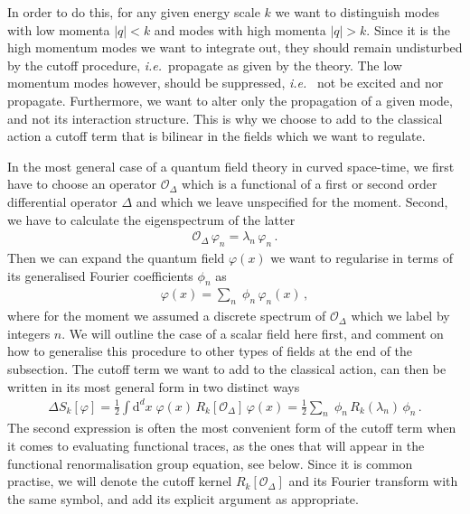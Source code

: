 \documentclass[11pt]{book}
\newcommand\ie{\textit{i.e.}\ }
\numberwithin{equation}{chapter}
\begin{document}
In order to do this, for any given energy scale $k$ we want to distinguish
modes with low momenta $|q|<k$ and modes with high momenta $|q|>k$.
Since it is the high momentum modes we want to integrate out, they should
remain undisturbed by the cutoff procedure, \ie propagate as given by
the theory. The low momentum modes however, should be suppressed, \ie
not be excited and nor propagate. Furthermore, we want to
alter only the propagation of a given mode, and not its interaction structure.
This is why we choose to add to the classical action a cutoff term that is
bilinear in the fields which we want to regulate.

In the most general case of a quantum field theory in curved space-time,
we first have to choose an operator $\mathcal O_\Delta$ which is
a functional of a first or second order differential operator $\Delta$ and
which we leave unspecified for the moment.
Second, we have to calculate the eigenspectrum of the latter
\begin{align}
  \mathcal O_\Delta \, \varphi_n = \lambda_n \, \varphi_n \,.
\end{align}
Then we can expand the quantum field $\varphi(x)$ we want to regularise in terms
of its generalised Fourier coefficients $\phi_n$ as
\begin{align}
  \varphi (x) = \sum_n \; \phi_n \, \varphi_n(x) \,,
\end{align}
where for the moment we assumed a discrete spectrum of $\mathcal O_\Delta$
which we label by integers $n$.
We will outline the case of a scalar field here first,
and comment on how to generalise this procedure to other types of fields
at the end of the subsection. The cutoff term we want to add to the classical
action, can then be written in its most general form in two distinct ways
\begin{align}
  \Delta S_k [\varphi]
  = \frac 12 \int \mathrm d^dx \;
  \varphi(x) \, R_k[ \mathcal O_\Delta ] \, \varphi(x)
  = \frac 12 \sum_n \;
  \phi_n \, R_k(\lambda_n) \, \phi_n \,.
\end{align}
The second expression is often the most convenient form of the cutoff
term when it comes to evaluating functional traces, as the ones that
will appear in the functional renormalisation group equation, see below.
Since it is common practise,
we will denote the cutoff kernel $R_k[ \mathcal O_\Delta ]$
and its Fourier transform with the same symbol, and add its
explicit argument as appropriate.
\end{document}
